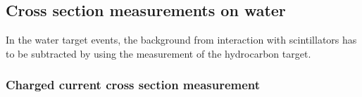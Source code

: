 %




\subsection{Cross section measurements on water}
In the water target events, the background from interaction with scintillators has to be subtracted by using the measurement of the hydrocarbon target.


\subsubsection{Charged current cross section measurement}


